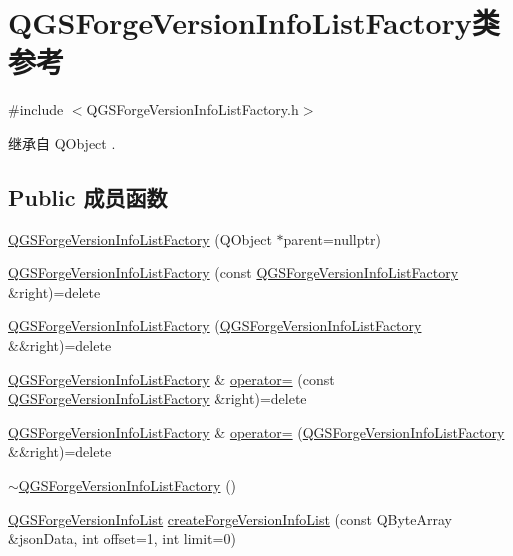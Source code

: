 \hypertarget{class_q_g_s_forge_version_info_list_factory}{}\section{Q\+G\+S\+Forge\+Version\+Info\+List\+Factory类 参考}
\label{class_q_g_s_forge_version_info_list_factory}


{\ttfamily \#include $<$Q\+G\+S\+Forge\+Version\+Info\+List\+Factory.\+h$>$}



继承自 Q\+Object .

\subsection*{Public 成员函数}
\begin{DoxyCompactItemize}
\item 
\mbox{\hyperlink{class_q_g_s_forge_version_info_list_factory_a5c37281cceb1a766a1133b4be332e61d}{Q\+G\+S\+Forge\+Version\+Info\+List\+Factory}} (Q\+Object $\ast$parent=nullptr)
\item 
\mbox{\hyperlink{class_q_g_s_forge_version_info_list_factory_ada62150a45b30182c7d6e4d29b29dfc0}{Q\+G\+S\+Forge\+Version\+Info\+List\+Factory}} (const \mbox{\hyperlink{class_q_g_s_forge_version_info_list_factory}{Q\+G\+S\+Forge\+Version\+Info\+List\+Factory}} \&right)=delete
\item 
\mbox{\hyperlink{class_q_g_s_forge_version_info_list_factory_a393b0b6a326e860d9decada851444104}{Q\+G\+S\+Forge\+Version\+Info\+List\+Factory}} (\mbox{\hyperlink{class_q_g_s_forge_version_info_list_factory}{Q\+G\+S\+Forge\+Version\+Info\+List\+Factory}} \&\&right)=delete
\item 
\mbox{\hyperlink{class_q_g_s_forge_version_info_list_factory}{Q\+G\+S\+Forge\+Version\+Info\+List\+Factory}} \& \mbox{\hyperlink{class_q_g_s_forge_version_info_list_factory_a05913e8c40ff934dad19cbab45747005}{operator=}} (const \mbox{\hyperlink{class_q_g_s_forge_version_info_list_factory}{Q\+G\+S\+Forge\+Version\+Info\+List\+Factory}} \&right)=delete
\item 
\mbox{\hyperlink{class_q_g_s_forge_version_info_list_factory}{Q\+G\+S\+Forge\+Version\+Info\+List\+Factory}} \& \mbox{\hyperlink{class_q_g_s_forge_version_info_list_factory_afa37202022b058e694f0d0bc7672ecaa}{operator=}} (\mbox{\hyperlink{class_q_g_s_forge_version_info_list_factory}{Q\+G\+S\+Forge\+Version\+Info\+List\+Factory}} \&\&right)=delete
\item 
\mbox{\hyperlink{class_q_g_s_forge_version_info_list_factory_a97eeb1af2e920fbe07ca3268777b3398}{$\sim$\+Q\+G\+S\+Forge\+Version\+Info\+List\+Factory}} ()
\item 
\mbox{\hyperlink{class_q_g_s_forge_version_info_list}{Q\+G\+S\+Forge\+Version\+Info\+List}} \mbox{\hyperlink{class_q_g_s_forge_version_info_list_factory_afb4cb541a5330f41838089a19a2600e0}{create\+Forge\+Version\+Info\+List}} (const Q\+Byte\+Array \&json\+Data, int offset=1, int limit=0)
\end{DoxyCompactItemize}


